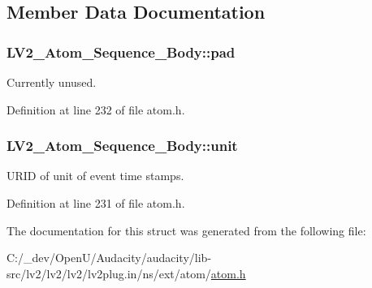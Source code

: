 \subsection{Member Data Documentation}
\subsubsection[{\texorpdfstring{pad}{pad}}]{ L\+V2\+\_\+\+Atom\+\_\+\+Sequence\+\_\+\+Body\+::pad}\hypertarget{struct_l_v2___atom___sequence___body_a59edee9bddcb33f78f603f6934d82aa5}{}\label{struct_l_v2___atom___sequence___body_a59edee9bddcb33f78f603f6934d82aa5}
Currently unused. 

Definition at line 232 of file atom.\+h.

\subsubsection[{\texorpdfstring{unit}{unit}}]{ L\+V2\+\_\+\+Atom\+\_\+\+Sequence\+\_\+\+Body\+::unit}\hypertarget{struct_l_v2___atom___sequence___body_a6ab94ba1bf66df8fb777be0fef2136e3}{}\label{struct_l_v2___atom___sequence___body_a6ab94ba1bf66df8fb777be0fef2136e3}
U\+R\+ID of unit of event time stamps. 

Definition at line 231 of file atom.\+h.



The documentation for this struct was generated from the following file\+:\begin{DoxyCompactItemize}
\item 
C\+:/\+\_\+dev/\+Open\+U/\+Audacity/audacity/lib-\/src/lv2/lv2/lv2/lv2plug.\+in/ns/ext/atom/\hyperlink{atom_8h}{atom.\+h}\end{DoxyCompactItemize}
